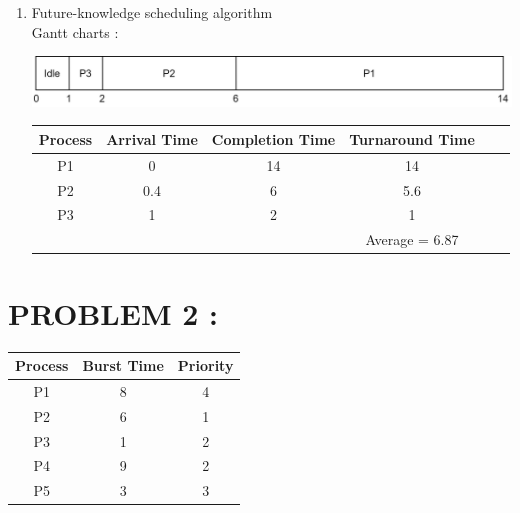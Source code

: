 \documentclass[a4paper]{article}
\begin{document}
\begin{enumerate}[label=\alph*)]
\item Future-knowledge scheduling algorithm
\\
Gantt charts : \\
\begin{center}
\includegraphics[scale=1]{ex1 future.png}
\end{center}
\begin{center}
\begin{tabular}{|c|c|c|c|c|c|}
\hline
Process & Arrival Time & Completion Time & Turnaround Time \\
\hline
P1 & 0 & 14 & 14 \\
\hline
P2 & 0.4 & 6 & 5.6 \\
\hline
P3 & 1 & 2 & 1 \\
\hline
&&& Average = 6.87 \\ 
\hline
\end{tabular}
\end{center}

\end{enumerate}

\section{PROBLEM 2 :}
\begin{center}
\begin{tabular}{c|c|c}
Process & Burst Time & Priority\\
\hline
P1 & 8 & 4 \\
P2 & 6 & 1 \\
P3 & 1 & 2 \\
P4 & 9 & 2 \\
P5 & 3 & 3 \\
\end{tabular}
\end{center}
\end{document}
